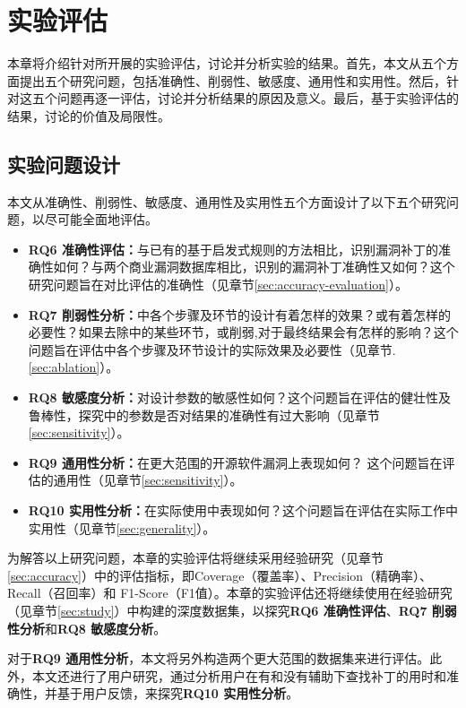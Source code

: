 \chapter{实验评估}

本章将介绍针对\tool 所开展的实验评估，讨论并分析实验的结果。首先，本文从五个方面提出五个研究问题，包括准确性、削弱性、敏感度、通用性和实用性。然后，针对这五个问题再逐一评估，讨论并分析结果的原因及意义。最后，基于实验评估的结果，讨论\tool 的价值及局限性。

\section{实验问题设计}
本文从准确性、削弱性、敏感度、通用性及实用性五个方面设计了以下五个研究问题，以尽可能全面地评估\tool 。

\begin{itemize}[leftmargin=*]
\item \textbf{RQ6 准确性评估：}与已有的基于启发式规则的方法相比，\tool 识别漏洞补丁的准确性如何？与两个商业漏洞数据库相比，\tool 识别的漏洞补丁准确性又如何？这个研究问题旨在对比评估\tool 的准确性（见章节\ref{sec:accuracy-evaluation}）。
\item \textbf{RQ7 削弱性分析：}\tool 中各个步骤及环节的设计有着怎样的效果？或有着怎样的必要性？如果去除\tool 中的某些环节，或削弱\tool ,对于最终结果会有怎样的影响？这个问题旨在评估\tool 中各个步骤及环节设计的实际效果及必要性（见章节.\ref{sec:ablation}）。
\item \textbf{RQ8 敏感度分析：}\tool 对设计参数的敏感性如何？这个问题旨在评估\tool 的健壮性及鲁棒性，探究\tool 中的参数是否对结果的准确性有过大影响（见章节\ref{sec:sensitivity}）。 
\item \textbf{RQ9 通用性分析：}\tool 在更大范围的开源软件漏洞上表现如何？ 这个问题旨在评估\tool 的通用性（见章节\ref{sec:sensitivity}）。
\item \textbf{RQ10 实用性分析：}\tool 在实际使用中表现如何？这个问题旨在评估\tool 在实际工作中实用性（见章节\ref{sec:generality}）。
\end{itemize}

为解答以上研究问题，本章的实验评估将继续采用经验研究（见章节\ref{sec:accuracy}）中的评估指标，即Coverage（覆盖率）、Precision（精确率）、Recall（召回率）和 F1-Score（F1值）。本章的实验评估还将继续使用在经验研究（见章节\ref{sec:study}）中构建的深度数据集，以探究\textbf{RQ6 准确性评估}、\textbf{RQ7 削弱性分析}和\textbf{RQ8 敏感度分析}。

对于\textbf{RQ9 通用性分析}，本文将另外构造两个更大范围的数据集来进行评估。此外，本文还进行了用户研究，通过分析用户在有和没有\tool 辅助下查找补丁的用时和准确性，并基于用户反馈，来探究\textbf{RQ10 实用性分析}。

